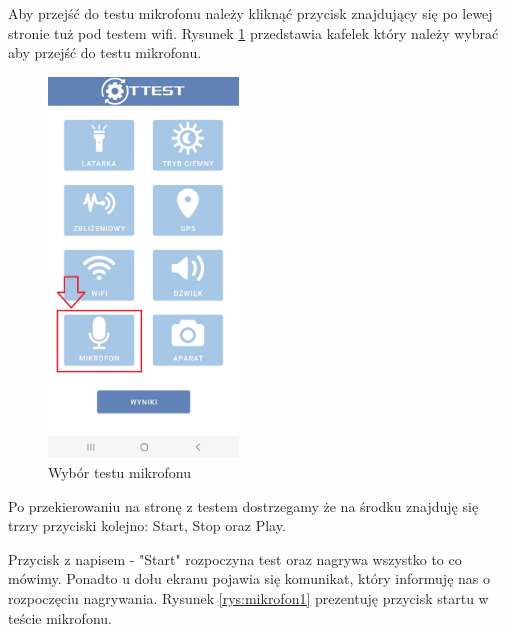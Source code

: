 \hspace{0.60cm}Aby przejść do testu mikrofonu należy kliknąć przycisk znajdujący się po lewej stronie tuż pod testem wifi. Rysunek \ref{rys:menu6} przedstawia kafelek który należy wybrać aby przejść do testu mikrofonu.

\begin{figure}[!hbt]
	\begin{center}
		\includegraphics[angle=360, width=0.45\textwidth]{rys/punkt6/menu6}
		\caption{Wybór testu mikrofonu}
		\label{rys:menu6}
	\end{center}
\end{figure}

Po przekierowaniu na stronę z testem dostrzegamy że na środku znajduję się trzry przyciski kolejno: Start, Stop oraz Play. 

\newpage


Przycisk z napisem - "Start" rozpoczyna test oraz nagrywa wszystko to co mówimy. Ponadto u dołu ekranu pojawia się komunikat, który informuję nas o rozpoczęciu nagrywania. Rysunek \ref{rys:mikrofon1} prezentuję przycisk startu w teście mikrofonu.

